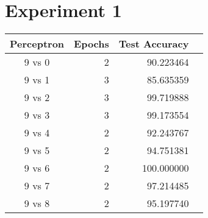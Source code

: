 \documentclass[12pt]{article}
\begin{document}
	\maketitle
	\section*{Experiment 1}
		\begin{tabular}{ | c || r | r | r |}
			\hline
			Perceptron & Epochs & Test Accuracy \\
			\hline
			9 vs 0 & 2& 90.223464 \\ 
			9 vs 1 & 3& 85.635359 \\ 
			9 vs 2 & 3& 99.719888 \\ 
			9 vs 3 & 3& 99.173554 \\ 
			9 vs 4 & 2& 92.243767 \\ 
			9 vs 5 & 2& 94.751381 \\ 
			9 vs 6 & 2& 100.000000 \\ 
			9 vs 7 & 2& 97.214485 \\ 
			9 vs 8 & 2& 95.197740 \\ 
			\hline
		\end{tabular}
		\newline
		\newline
		\newline
\end{document}
